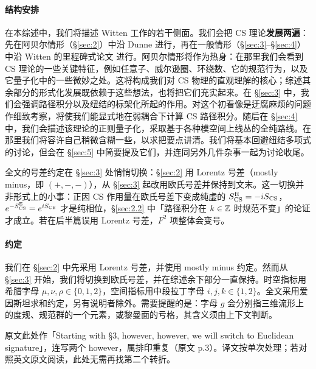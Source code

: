 \paragraph{结构安排}
在本综述中，我们将描述 Witten 工作的若干侧面。我们会把 CS 理论\textbf{发展两遍}：先在阿贝尔情形（\S\ref{sec:2}）中沿 Dunne \cite{dunne} 进行，再在一般情形（\S\ref{sec:3}--\S\ref{sec:4}）中沿 Witten 的里程碑式论文 \cite{witten1989} 进行。阿贝尔情形将作为热身：在那里我们会看到 CS 理论的一些关键特征，例如任意子、威尔逊圈、环绕数、它的规范行为，以及它量子化中的一些微妙之处。这将构成我们对 CS 物理的直观理解的核心；综述其余部分的形式化发展既依赖于这些想法，也将把它们充实起来。在 \S\ref{sec:3} 中，我们会强调路径积分以及纽结的标架化所起的作用。对这个初看像是迂腐麻烦的问题作细致考察，将使我们能显式地在弱耦合下计算 CS 路径积分。随后在 \S\ref{sec:4} 中，我们会描述该理论的正则量子化，采取基于各种模空间上线丛的全纯路线。在那里我们将容许自己稍微含糊一些，以求把要点讲清。我们将基本回避纽结多项式的讨论，但会在 \S\ref{sec:5} 中简要提及它们，并连同另外几件杂事一起为讨论收尾。

\begin{yizhu}[易错点]
全文的号差约定在 \S\ref{sec:3} 处悄悄切换：\S\ref{sec:2} 用 Lorentz 号差（mostly minus，即 $(+,-,-)$），从 \S\ref{sec:3} 起改用欧氏号差并保持到文末。这一切换并非形式上的小事：正因 CS 作用量在欧氏号差下变成纯虚的 $S^{\mathrm{E}}_{\mathrm{CS}}=-iS_{\mathrm{CS}}$，$e^{-S^{\mathrm{E}}_{\mathrm{CS}}}=e^{iS_{\mathrm{CS}}}$ 才是纯相位，\S\ref{sec:2.2} 中「路径积分在 $k\in\mathbb{Z}$ 时规范不变」的论证才成立。若在后半篇误用 Lorentz 号差，$F^2$ 项整体会变号。
\end{yizhu}

\paragraph{约定}
我们在 \S\ref{sec:2} 中先采用 Lorentz 号差，并使用 mostly minus 约定。然而从 \S\ref{sec:3} 开始，我们将切换到欧氏号差，并在综述余下部分一直保持。时空指标用希腊字母 $\mu,\nu,\rho\in\{0,1,2\}$，空间指标用中段拉丁字母 $i,j,k\in\{1,2\}$。全文采用爱因斯坦求和约定，另有说明者除外。需要提醒的是：字母 $g$ 会分别指三维流形上的度规、规范群的一个元素，或黎曼面的亏格，其含义须由上下文判断。

\begin{yizhu}[原文疑误]
原文此处作「Starting with \S3, however, however, we will switch to Euclidean signature」，连写两个 however，属排印重复（原文 p.3）。译文按单次处理；若对照英文原文阅读，此处无需再找第二个转折。
\end{yizhu}

